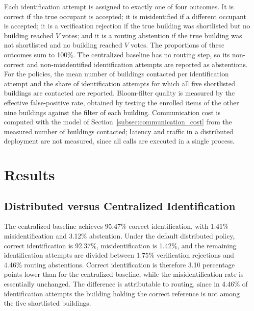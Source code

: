 \documentclass[pdflatex,sn-mathphys-num]{sn-jnl}%
\theoremstyle{thmstyleone}%
\theoremstyle{thmstyletwo}%
\theoremstyle{thmstylethree}%
\begin{document}
Each identification attempt is assigned to exactly one of four outcomes. It is correct if the true occupant is accepted; it is misidentified if a different occupant is accepted; it is a verification rejection if the true building was shortlisted but no building reached $V$ votes; and it is a routing abstention if the true building was not shortlisted and no building reached $V$ votes. The proportions of these outcomes sum to 100\%. The centralized baseline has no routing step, so its non-correct and non-misidentified identification attempts are reported as abstentions. For the policies, the mean number of buildings contacted per identification attempt and the share of identification attempts for which all five shortlisted buildings are contacted are reported. Bloom-filter quality is measured by the effective false-positive rate, obtained by testing the enrolled items of the other nine buildings against the filter of each building. Communication cost is computed with the model of Section~\ref{subsec:communication_cost} from the measured number of buildings contacted; latency and traffic in a distributed deployment are not measured, since all calls are executed in a single process.


\section{Results}
\label{sec:results}

\subsection{Distributed versus Centralized Identification}

The centralized baseline achieves 95.47\% correct identification, with 1.41\% misidentification and 3.12\% abstention. Under the default distributed policy, correct identification is 92.37\%, misidentification is 1.42\%, and the remaining identification attempts are divided between 1.75\% verification rejections and 4.46\% routing abstentions. Correct identification is therefore 3.10 percentage points lower than for the centralized baseline, while the misidentification rate is essentially unchanged. The difference is attributable to routing, since in 4.46\% of identification attempts the building holding the correct reference is not among the five shortlisted buildings.
\end{document}
